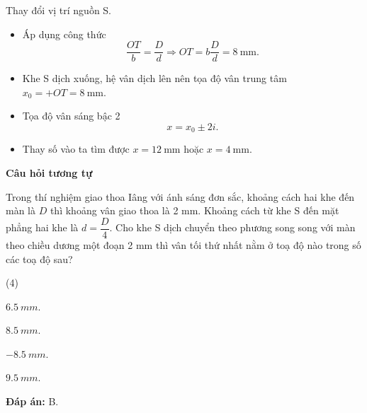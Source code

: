 \begin{dang}{Thay đổi vị trí nguồn S.}
{		\begin{itemize}
			\item Áp dụng công thức
			\begin{equation*}
				\dfrac{OT}{b}=\dfrac{D}{d} \Rightarrow OT = b \dfrac{D}{d}=8\ \text{mm}.
			\end{equation*}
			\item Khe S dịch xuống, hệ vân dịch lên nên tọa độ vân trung tâm $x_0= + OT = 8\ \text{mm}$.
			\item Tọa độ vân sáng bậc 2
			\begin{equation*}
				x=x_0 \pm 2i.
			\end{equation*}
			\item Thay số vào ta tìm được $x = 12\ \text{mm}$ hoặc $x=4\ \text{mm}$.
		\end{itemize}
		
		\begin{center}
			\textbf{Câu hỏi tương tự}
		\end{center}
		
		Trong thí nghiệm giao thoa Iâng với ánh sáng đơn sắc, khoảng cách hai khe đến màn là $D$ thì khoảng vân giao thoa là 2 mm. Khoảng cách từ khe S đến mặt phẳng hai khe là $d = \dfrac{D}{4}$. Cho khe S dịch chuyển theo phương song song với màn theo chiều dương một đoạn 2 mm thì vân tối thứ nhất nằm ở toạ độ nào trong số các toạ độ sau?
		\begin{mcq}(4)
			\item $ \SI{+6,5}{mm} $.
			\item $ \SI{+8,5}{mm} $.			
			\item $ \SI{-8,5}{mm} $.			
			\item $ \SI{+9,5}{mm} $.
		\end{mcq}
		
		\textbf{Đáp án:} B.
	}
	
\end{dang}

